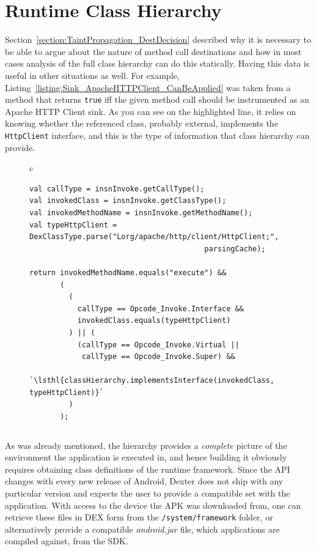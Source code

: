 \documentclass[12pt,twoside,notitlepage]{report}
\newcommand{\highlight}[1]{\colorbox{lightOrange}{\strut #1}}
\newcommand{\lsthl}[1] {\ttfamily\scriptsize\highlight{#1}}
\begin{document}
\section{Runtime Class Hierarchy}

Section~\ref{section:TaintPropagation_DestDecision} described why it is necessary to be able to argue about the nature of method call destinations and how in most cases analysis of the full class hierarchy can do this statically. Having this data is useful in other situations as well. For example, Listing~\ref{listing:Sink_ApacheHTTPClient_CanBeApplied} was taken from a method that returns \verb$true$ iff the given method call should be instrumented as an Apache HTTP Client sink. As you can see on the highlighted line, it relies on knowing whether the referenced class, probably external, implements the \verb$HttpClient$ interface, and this is the type of information that class hierarchy can provide.

\begin{figure}[h]
	\centering
	\begin{tabular}{c}
	\begin{lstlisting}
val callType = insnInvoke.getCallType();
val invokedClass = insnInvoke.getClassType();
val invokedMethodName = insnInvoke.getMethodName();
val typeHttpClient = DexClassType.parse("Lorg/apache/http/client/HttpClient;", 
                                        parsingCache);

return invokedMethodName.equals("execute") &&
       (
         (
           callType == Opcode_Invoke.Interface && 
           invokedClass.equals(typeHttpClient)
         ) || (
           (callType == Opcode_Invoke.Virtual || 
           	callType == Opcode_Invoke.Super) && 
           `\lsthl{classHierarchy.implementsInterface(invokedClass, typeHttpClient)}`
         )
       );
	\end{lstlisting}
	\end{tabular}
	\begin{lstlisting}[caption={Code that decides whether a method call given by instruction in \texttt{insnInvoke} should be instrumented as an Apache HTTP Client sink.},
	                   label={listing:Sink_ApacheHTTPClient_CanBeApplied}]
	\end{lstlisting}
\end{figure}

As was already mentioned, the hierarchy provides a \emph{complete} picture of the environment the application is executed in, and hence building it obviously requires obtaining class definitions of the runtime framework. Since the API changes with every new release of Android, Dexter does not ship with any particular version and expects the user to provide a compatible set with the application. With access to the device the APK was downloaded from, one can retrieve these files in DEX form from the \verb$/system/framework$ folder, or alternatively provide a compatible \emph{android.jar} file, which applications are compiled against, from the SDK. 
\end{document}
